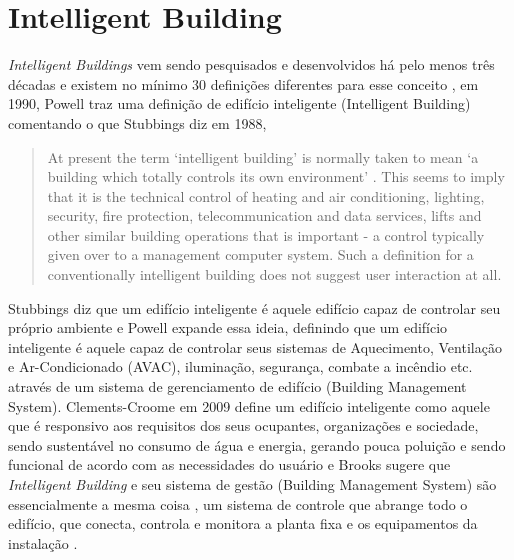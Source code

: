 \section{Intelligent Building}
\emph{Intelligent Buildings} vem sendo pesquisados e desenvolvidos há pelo menos três décadas \cite{Buckman2014} e existem no mínimo 30 definições diferentes para esse conceito \cite{Wigginton2002}, em 1990, Powell traz uma definição de edifício inteligente (Intelligent Building) comentando o que Stubbings diz em 1988,
\begin{quote}
    At present the term ‘intelligent building’ is normally taken to mean ‘a building which totally controls its own environment’ \cite{stubbings1986}. This seems to imply that it is the technical control of heating and air conditioning, lighting, security, fire protection, telecommunication and data services, lifts and other similar building operations that is important - a control typically given over to a management computer system. Such a definition for a conventionally intelligent building does not suggest user interaction at all. \cite{Powell1990}
\end{quote}Stubbings diz que um edifício inteligente é aquele edifício capaz de controlar seu próprio ambiente e Powell expande essa ideia, definindo que um edifício inteligente é aquele capaz de controlar seus sistemas de Aquecimento, Ventilação e Ar-Condicionado (AVAC), iluminação, segurança, combate a incêndio etc. através de um sistema de gerenciamento de edifício (Building Management System). Clements-Croome em 2009 define um edifício inteligente como aquele que é responsivo aos requisitos dos seus ocupantes, organizações e sociedade, sendo sustentável no consumo de água e energia, gerando pouca poluição e sendo funcional de acordo com as necessidades do usuário \cite{croome2011} e Brooks sugere que \emph{Intelligent Building} e seu sistema de gestão (Building Management System) são essencialmente a mesma coisa \cite{Buckman2014}, um sistema de controle que abrange todo o edifício, que conecta, controla e monitora a planta fixa e os equipamentos da instalação \cite{brooks2012}.


